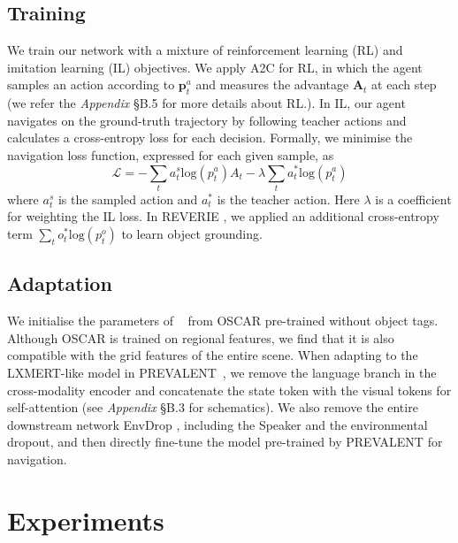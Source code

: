 \documentclass[final]{cvpr}
\begin{document}
\subsection{Training}
We train our network with a mixture of reinforcement learning (RL) and imitation learning (IL) objectives. We apply A2C \cite{mnih2016asynchronous} for RL, in which the agent samples an action according to $\boldsymbol{p}^{a}_{t}$ and measures the advantage $\boldsymbol{A}_{t}$ at each step (we refer the \textit{Appendix} \S B.5 for more details about RL.). In IL, our agent navigates on the ground-truth trajectory by following teacher actions and calculates a cross-entropy loss for each decision. Formally, we minimise the navigation loss function, expressed for each given sample, as
\begin{equation}
\mathcal{L} = -\sum_{t} a^{s}_{t}\text{log}\left(p^{a}_{t}\right)A_{t} - \lambda \sum_{t} a^{*}_{t}\text{log}\left(p^{a}_{t}\right)
\label{eqn:objective}
\end{equation}
where $a^{s}_{t}$ is the sampled action and $a^{*}_{t}$ is the teacher action. Here $\lambda$ is a coefficient for weighting the IL loss. In REVERIE \cite{qi2020reverie}, we applied an additional cross-entropy term $\sum_{t} o^{*}_{t}\text{log}(p^{o}_{t})$ to learn object grounding.


\subsection{Adaptation}
We initialise the parameters of \vlnbert~ from OSCAR \cite{li2020oscar} pre-trained without object tags. Although OSCAR is trained on regional features, we find that it is also compatible with the grid features of the entire scene. 
When adapting to the LXMERT-like \cite{tan2019lxmert} model in PREVALENT~\cite{hao2020towards}, we remove the language branch in the cross-modality encoder and concatenate the state token with the visual tokens for self-attention (see \textit{Appendix} \S B.3 for schematics). We also remove the entire downstream network EnvDrop \cite{tan2019learning}, including the Speaker and the environmental dropout, and then directly fine-tune the model pre-trained by PREVALENT for navigation. 

 \section{Experiments} 
\label{sec:experiments}
\end{document}
